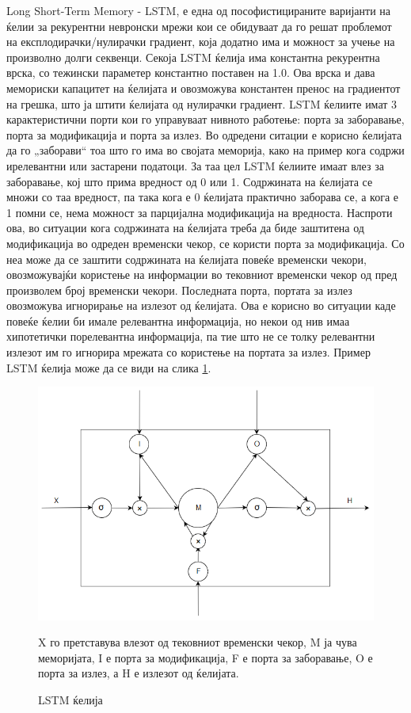 Long Short-Term Memory - LSTM, е една од пософистицираните варијанти на ќелии за рекурентни невронски мрежи кои се обидуваат да го решат проблемот на експлодирачки/нулирачки градиент, која додатно има и можност за учење на произволно долги секвенци. Секоја LSTM ќелија има константна рекурентна врска, со тежински параметер константно поставен на 1.0. Ова врска и дава мемориски капацитет на ќелијата и овозможува константен пренос на градиентот на грешка, што ја штити ќелијата од нулирачки градиент. 
LSTM ќелиите имат 3 карактеристични порти кои го управуваат нивното работење: порта за заборавање, порта за модификација и порта за излез. Во одредени ситации е корисно ќелијата да го „заборави“ тоа што го има во својата меморија, како на пример кога содржи ирелевантни или застарени податоци. За таа цел LSTM ќелиите имаат влез за заборавање, кој што прима вредност од 0 или 1. Содржината на ќелијата се множи со таа вредност, па така кога е 0 ќелијата практично заборава се, а кога е 1 помни се, нема можност за парцијална модификација на вредноста. Наспроти ова, во ситуации кога содржината на ќелијата треба да биде заштитена од модификација во одреден временски чекор, се користи порта за модификација. Со неа може да се заштити содржината на ќелијата повеќе временски чекори, овозможувајќи користење на информации во тековниот временски чекор од пред произволем број временски чекори. Последната порта, портата за излез овозможува игнорирање на излезот од ќелијата. Ова е корисно во ситуации каде повеќе ќелии би имале релевантна информација, но некои од нив имаа хипотетички порелевантна информација, па тие што не се толку релевантни излезот им го игнорира мрежата со користење на портата за излез. Пример LSTM ќелија може да се види на слика \ref{fig:lstm}.

\begin{figure}[H]
	\centering
    \includegraphics[scale=0.6]{images/lstm.png}
	\caption{LSTM ќелија}
	X го претставува влезот од тековниот временски чекор, M ја чува меморијата, I е порта за модификација, F е порта за заборавање, O е порта за излез, а H е излезот од ќелијата.
	\label{fig:lstm}
\end{figure}

